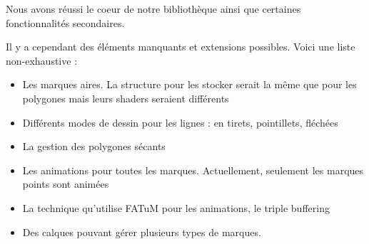 \documentclass[12pt]{article}
\begin{document}
Nous avons réussi le coeur de notre bibliothèque ainsi que certaines fonctionnalités
secondaires.

Il y a cependant des éléments manquants et extensions possibles.
Voici une liste non-exhaustive :

\begin{itemize}
\item Les marques aires. La structure pour les stocker serait la même que pour les
polygones mais leurs shaders seraient différents
\item Différents modes de dessin pour les lignes : en tirets, pointillets, fléchées
\item La gestion des polygones sécants
\item Les animations pour toutes les marques. Actuellement, seulement les marques points
sont animées
\item La technique qu'utilise FATuM pour les animations, le triple buffering
\item Des calques pouvant gérer plusieurs types de marques.
\end{itemize}

\printglossaries
\printbibliography
\end{document}
